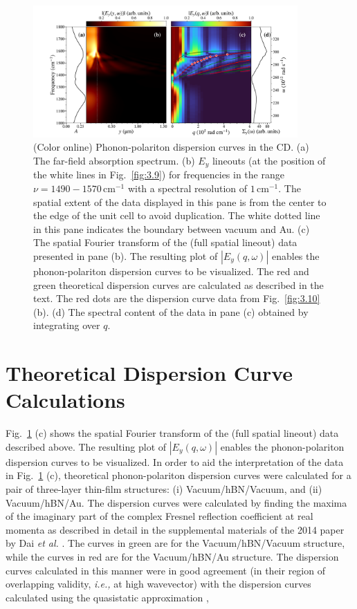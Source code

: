 \documentclass[preprint,
amsmath,amssymb,
aip,
jap,
floatfix,]{revtex4-2}
\begin{document}
				\begin{figure}[!htb]
				  \includegraphics[width=0.9\textwidth]{Figures/Fig6.pdf}
				  \caption{(Color online) Phonon-polariton dispersion curves in the CD. (a) The far-field absorption spectrum. (b) $E_y$ lineouts (at the position of the white lines in Fig.~\ref{fig:3.9}) for frequencies in the range $\nu = 1490 - 1570\, \mathrm{cm}^{-1}$ with a spectral resolution of $1\, \mathrm{cm}^{-1}$. The spatial extent of the data displayed in this pane is from the center to the edge of the unit cell to avoid duplication. The white dotted line in this pane indicates the boundary between vacuum and Au. (c) The spatial Fourier transform of the (full spatial lineout) data presented in pane (b). The resulting plot of $|E_y(q,\omega)|$ enables the phonon-polariton dispersion curves to be visualized. The red and green theoretical dispersion curves are calculated as described in the text. The red dots are the dispersion curve data from Fig.~\ref{fig:3.10} (b). (d) The spectral content of the data in pane (c) obtained by integrating over $q$.
				  }
				  \label{fig:3.11}
				\end{figure}
		
		\section{Theoretical Dispersion Curve Calculations}
		\label{sec:DCC}
		
				Fig.~\ref{fig:3.11} (c) shows the spatial Fourier transform of the (full spatial lineout) data described above. The resulting plot of $|E_y(q,\omega)|$ enables the phonon-polariton dispersion curves to be visualized. In order to aid the interpretation of the data in Fig.~\ref{fig:3.11} (c), theoretical phonon-polariton dispersion curves were calculated for a pair of three-layer thin-film structures: (i) Vacuum/hBN/Vacuum, and (ii) Vacuum/hBN/Au. The dispersion curves were calculated by finding the maxima of the imaginary part of the complex Fresnel reflection coefficient at real momenta as described in detail in the supplemental materials of the 2014 paper by Dai \textit{et al.} \cite{Dai:14}. The curves in green are for the  Vacuum/hBN/Vacuum structure, while the curves in red are for the Vacuum/hBN/Au structure. The dispersion curves calculated in this manner were in good agreement (in their region of overlapping validity, \textit{i.e.,} at high wavevector) with the dispersion curves calculated using the quasistatic approximation \cite{Dai:14, Kumar:15}, 
			
\end{document}
